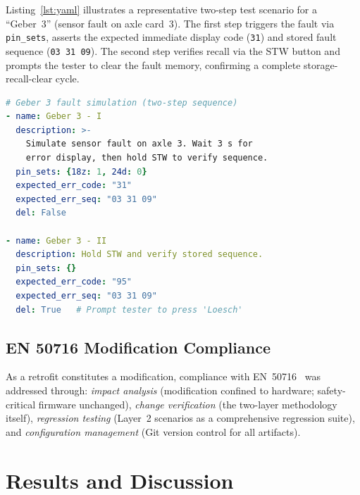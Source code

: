 \documentclass[journal, a4paper]{IEEEtran}
\begin{document}
Listing~\ref{lst:yaml} illustrates a representative two-step test scenario for a ``Geber~3'' (sensor fault on axle card~3). The first step triggers the fault via \texttt{pin\_sets}, asserts the expected immediate display code (\texttt{31}) and stored fault sequence (\texttt{03 31 09}). The second step verifies recall via the STW button and prompts the tester to clear the fault memory, confirming a complete storage-recall-clear cycle.

\begin{lstlisting}[language=YAML, caption={Example YAML test scenario: Geber~3 fault memory cycle.}, label={lst:yaml}, float=t]
# Geber 3 fault simulation (two-step sequence)
- name: Geber 3 - I
  description: >-
    Simulate sensor fault on axle 3. Wait 3 s for
    error display, then hold STW to verify sequence.
  pin_sets: {18z: 1, 24d: 0}
  expected_err_code: "31"
  expected_err_seq: "03 31 09"
  del: False

- name: Geber 3 - II
  description: Hold STW and verify stored sequence.
  pin_sets: {}
  expected_err_code: "95"
  expected_err_seq: "03 31 09"
  del: True   # Prompt tester to press 'Loesch'
\end{lstlisting}

\subsection{EN 50716 Modification Compliance}
\label{sec:en50716}

As a retrofit constitutes a modification, compliance with EN~50716~\cite{en50716_2023} was addressed through: \textit{impact analysis} (modification confined to hardware; safety-critical firmware unchanged), \textit{change verification} (the two-layer methodology itself), \textit{regression testing} (Layer~2 scenarios as a comprehensive regression suite), and \textit{configuration management} (Git version control for all artifacts).

\section{Results and Discussion}
\label{sec:results}
\end{document}
